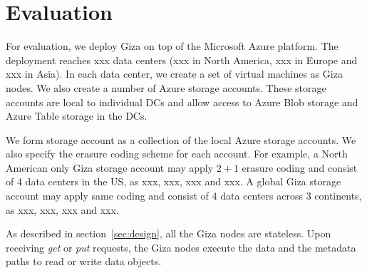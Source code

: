 \section{Evaluation}


For evaluation, we deploy Giza on top of the Microsoft Azure platform. The deployment reaches xxx data centers (xxx in North America, xxx in Europe and xxx in Asia). In each data center, we create a set of virtual machines as Giza nodes. We also create a number of Azure storage accounts. These storage accounts are local to individual DCs and allow access to Azure Blob storage and Azure Table storage in the DCs.

We form \name storage account as a collection of the local Azure storage accounts. We also specify the erasure coding scheme for each account. For example, a North American only Giza storage account may apply $2+1$ erasure coding and consist of 4 data centers in the US, as xxx, xxx, xxx and xxx. A global Giza storage account may apply same coding and consist of 4 data centers across 3 continents, as xxx, xxx, xxx and xxx.

As described in section~\ref{sec:design}, all the Giza nodes are stateless. Upon receiving {\em get} or {\em put} requests, the Giza nodes execute the data and the metadata paths to read or write data objects.

